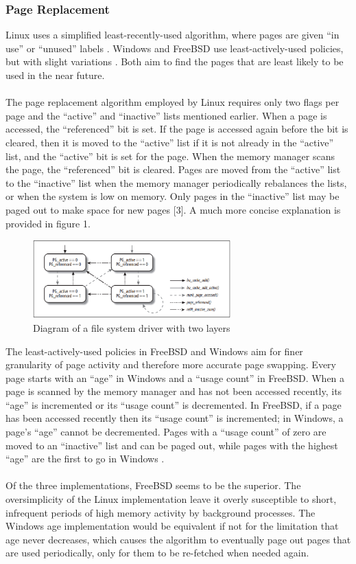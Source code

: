 \documentclass[10pt,draftclsnofoot,onecolumn]{article}
\begin{document}
\subsubsection{Page Replacement}

Linux uses a simplified least-recently-used algorithm, where pages are given “in use” or “unused” labels \cite{Loonix}. Windows and FreeBSD use least-actively-used policies, but with slight variations \cite{BSDM, Wandos}. Both aim to find the pages that are least likely to be used in the near future.
\\\\
The page replacement algorithm employed by Linux requires only two flags per page and the “active” and “inactive” lists mentioned earlier. When a page is accessed, the “referenced” bit is set. If the page is accessed again before the bit is cleared, then it is moved to the “active” list if it is not already in the “active” list, and the “active” bit is set for the page. When the memory manager scans the page, the “referenced” bit is cleared. Pages are moved from the “active” list to the “inactive” list when the memory manager periodically rebalances the lists, or when the system is low on memory. Only pages in the “inactive” list may be paged out to make space for new pages [3]. A much more concise explanation is provided in figure 1.\\

\begin{figure}[h!]
	\centering
	\includegraphics[width=3in]{linuxPagingAlg}
	\caption{Diagram of a file system driver with two layers}
	\label{fig:layered}
\end{figure}

\noindent The least-actively-used policies in FreeBSD and Windows aim for finer granularity of page activity and therefore more accurate page swapping. Every page starts with an “age” in Windows and a “usage count” in FreeBSD. When a page is scanned by the memory manager and has not been accessed recently, its “age” is incremented or its “usage count” is decremented. In FreeBSD, if a page has been accessed recently then its “usage count” is incremented; in Windows, a page’s “age” cannot be decremented. Pages with a “usage count” of zero are moved to an “inactive” list and can be paged out, while pages with the highest “age” are the first to go in Windows \cite{Wandos, BSDM}.
\\\\
Of the three implementations, FreeBSD seems to be the superior. The oversimplicity of the Linux implementation leave it overly susceptible to short, infrequent periods of high memory activity by background processes. The Windows age implementation would be equivalent if not for the limitation that age never decreases, which causes the algorithm to eventually page out pages that are used periodically, only for them to be re-fetched when needed again.
\end{document}
